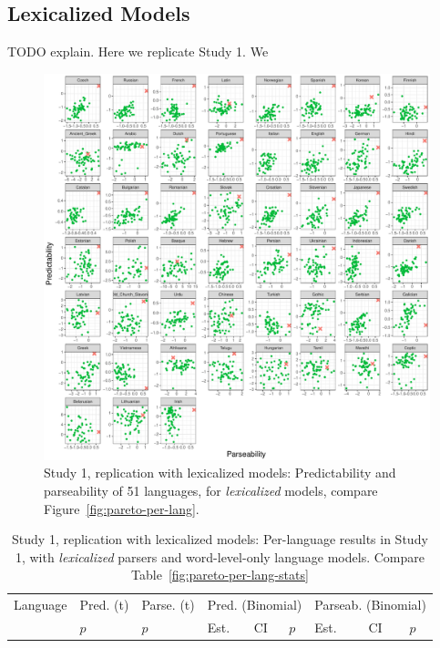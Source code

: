 \documentclass[10pt,twoside,lineno]{article}
\begin{document}
\subsection{Lexicalized Models}


TODO explain.
Here we replicate Study 1.
We 

\begin{figure}
\centering
\includegraphics[width=\textwidth]{../results/plane/unlexicalized/pareto-plane-perLanguage-lexicalized-mle.pdf}
	\caption[Predictability and Parseability]{Study 1, replication with lexicalized models: Predictability and parseability of 51 languages, for \emph{lexicalized} models, compare Figure~\ref{fig:pareto-per-lang}.}
\end{figure}


\begin{table}
\centering
\small{
\begin{tabular}{l||ll|lll|lll}
Language & Pred. (t) & Parse. (t) & \multicolumn{3}{c|}{Pred. (Binomial)} & \multicolumn{3}{c}{Parseab. (Binomial)} \\ 
&  $p$ & $p$ &  Est. &CI & $p$ & Est. & CI & $p$  \\ \hline \hline

\end{tabular}
}
	\caption{Study 1, replication with lexicalized models: Per-language results in Study 1, with \emph{lexicalized} parsers and word-level-only language models. Compare Table~\ref{fig:pareto-per-lang-stats}}
\end{table}
\end{document}
